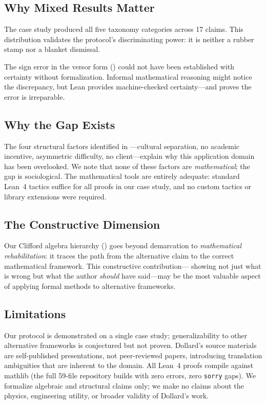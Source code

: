\documentclass[runningheads]{llncs}
\begin{document}
\subsection{Why Mixed Results Matter}

The case study produced all five taxonomy categories across 17 claims. This
distribution validates the protocol's discriminating power: it is neither
a rubber stamp nor a blanket dismissal.

The sign error in the versor form () could not have been
established with certainty without formalization. Informal mathematical
reasoning might notice the discrepancy, but Lean provides machine-checked
certainty---and proves the error is irreparable.

\subsection{Why the Gap Exists}

The four structural factors identified in ---cultural
separation, no academic incentive, asymmetric difficulty, no client---explain
why this application domain has been overlooked. We note that none of these
factors are \emph{mathematical}; the gap is sociological. The mathematical
tools are entirely adequate: standard Lean~4 tactics suffice for all proofs in
our case study, and no custom tactics or library extensions were required.

\subsection{The Constructive Dimension}

Our Clifford algebra hierarchy () goes beyond demarcation
to \emph{mathematical rehabilitation}: it traces the path from the alternative
claim to the correct mathematical framework. This constructive contribution---
showing not just what is wrong but what the author \emph{should} have
said---may be the most valuable aspect of applying formal methods to
alternative frameworks.

\subsection{Limitations}

Our protocol is demonstrated on a single case study; generalizability to other
alternative frameworks is conjectured but not proven. Dollard's source materials
are self-published presentations, not peer-reviewed papers, introducing
translation ambiguities that are inherent to the domain. All Lean~4 proofs
compile against mathlib (the full 59-file repository builds with
zero errors, zero \texttt{sorry} gaps). We formalize algebraic and structural
claims only; we make no claims about the physics, engineering utility, or
broader validity of Dollard's work.
\end{document}
